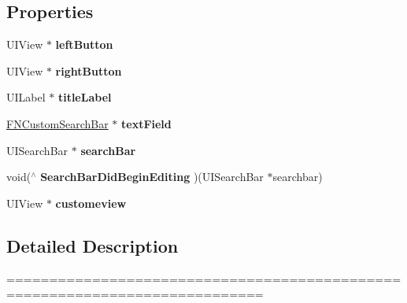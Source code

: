 \subsection*{Properties}
\begin{DoxyCompactItemize}
\item 
\mbox{\label{interface_f_n_custome_navigation_bar_aecce5550fce6a24ff8067aff5c581ce1}} 
U\+I\+View $\ast$ {\bfseries left\+Button}
\item 
\mbox{\label{interface_f_n_custome_navigation_bar_a682172d840ff75946a8360dc5933d28f}} 
U\+I\+View $\ast$ {\bfseries right\+Button}
\item 
\mbox{\label{interface_f_n_custome_navigation_bar_a2e81ba5f4b1e0b07ce6c4acf7ea275a1}} 
U\+I\+Label $\ast$ {\bfseries title\+Label}
\item 
\mbox{\label{interface_f_n_custome_navigation_bar_acfea78853f7d91d5b7488bb762a8f600}} 
\mbox{\hyperlink{interface_f_n_custom_search_bar}{F\+N\+Custom\+Search\+Bar}} $\ast$ {\bfseries text\+Field}
\item 
\mbox{\label{interface_f_n_custome_navigation_bar_a41f3a42964acfe03da3f3b98cc546e98}} 
U\+I\+Search\+Bar $\ast$ {\bfseries search\+Bar}
\item 
\mbox{\label{interface_f_n_custome_navigation_bar_aca9cb0956b1f1043d78f37a711c14dce}} 
void($^\wedge$ {\bfseries Search\+Bar\+Did\+Begin\+Editing} )(U\+I\+Search\+Bar $\ast$searchbar)
\item 
\mbox{\label{interface_f_n_custome_navigation_bar_a83ee3c08ad84aee1caebb2d41daeb5cc}} 
U\+I\+View $\ast$ {\bfseries customeview}
\end{DoxyCompactItemize}


\subsection{Detailed Description}
============================================================================

